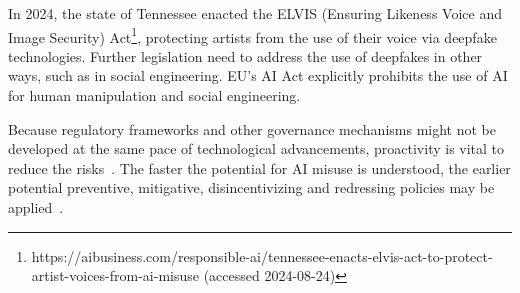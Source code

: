 In 2024, the state of Tennessee enacted the ELVIS (Ensuring Likeness Voice and Image Security) Act\footnote{https://aibusiness.com/responsible-ai/tennessee-enacts-elvis-act-to-protect-artist-voices-from-ai-misuse (accessed 2024-08-24)}, protecting artists from the use of their voice via deepfake technologies. Further legislation need to address the use of deepfakes in other ways, such as in social engineering. EU's AI Act explicitly prohibits the use of AI for human  manipulation and social engineering.

Because regulatory frameworks and other governance mechanisms might not be developed at the same pace of technological advancements, proactivity is vital to reduce the risks~\citep{blauth_AI_Crime_Overview_Malicious_Use_Abuse_2022}. The faster the potential for AI misuse is understood, the earlier potential preventive, mitigative, disincentivizing and redressing policies may be applied~\citep{king_AI_Crime_Interdisciplinary_Analysis_2019}.